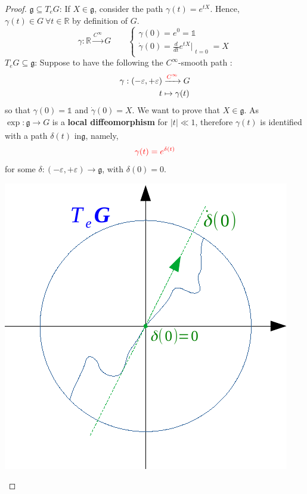\documentclass[../main.tex]{subfiles}
\begin{document}
\begin{proof}
\underline{$\mathfrak{g}\subseteq T_eG$}: If $X\in\mathfrak{g}$, consider the path $\gamma(t)=e^{tX}$. Hence, $\gamma(t)\in G\ \forall t\in\mathbb{R}$ by definition of $G$.
\[
\gamma:\mathbb{R}\xrightarrow[]{C^{\infty}}G\quad\quad\begin{cases}
\gamma(0)=e^0=\mathbb{1}\\
\Dot{\gamma}(0)=\frac{d}{dt}e^{tX}\Bigr|_{\substack{t=0}}=X
\end{cases}
\]
\underline{$T_eG\subseteq\mathfrak{g}$}: Suppose to have the following the $C^\infty$-smooth path :
\begin{align*}
    \gamma: (-\varepsilon,+\varepsilon)&\xrightarrow[]{{\color{red}C^{\infty}}}G\\
    t&\mapsto\gamma(t)
\end{align*}
so that $\gamma(0)=\mathbb{1}$ and $\Dot{\gamma}(0)=X$. We want to prove that $X\in\mathfrak{g}$. As $\exp:\mathfrak{g}\xrightarrow[]{}G$ is a \textbf{local diffeomorphism} for $|t|\ll1$, therefore $\gamma(t)$ is identified with a path $\delta(t)$ in$\mathfrak{g}$, namely,
\[
{\color{red}\gamma(t)=e^{\delta(t)}}
\]
    for some $\delta:(-\varepsilon,+\varepsilon)\to\mathfrak{g}$, with $\delta(0)=0$.\begin{marginfigure}[5mm]
    \includegraphics[]{images/lie_algebra_tangent.pdf}

\end{marginfigure}
\end{proof}
\end{document}
